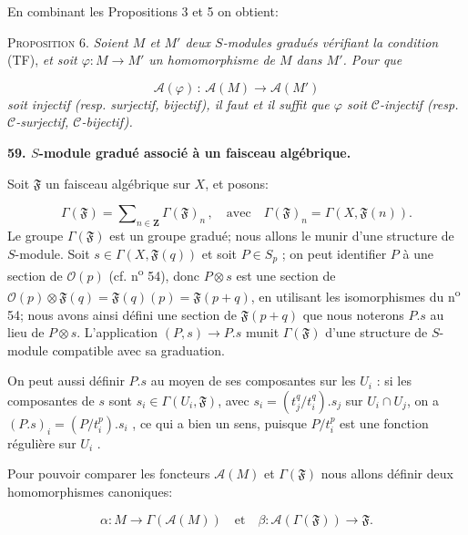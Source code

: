 En combinant les Propositions 3 et 5 on obtient:

\textsc{Proposition} 6. \textit{Soient $M$ et $M'$ deux $S$-modules gradués vérifiant la condition} (TF), \textit{et soit $\varphi : M \to M'$ un homomorphisme de $M$ dans $M'$. Pour que}

\begin{equation*}
\mathcal{A}(\varphi) \, : \, \mathcal{A}(M) \to \mathcal{A}(M')
\end{equation*}
\textit{soit injectif (resp. surjectif, bijectif), il faut et il suffit que $\varphi$ soit $\mathcal{C}$-injectif (resp. $\mathcal{C}$-surjectif, $\mathcal{C}$-bijectif).}


\textbf{59. $S$-module gradué associé à un faisceau algébrique.}

Soit $\mathfrak{F}$ un faisceau algébrique sur $X$, et posons:

\begin{equation*}
\Gamma(\mathfrak{F}) = \sum\nolimits_{n \in \mathbf{Z}} \Gamma(\mathfrak{F})_{n} \, , \quad \mathrm{avec} \quad \Gamma(\mathfrak{F})_{n} = \Gamma(X, \mathfrak{F}(n)).
\end{equation*}
Le groupe $\Gamma(\mathfrak{F})$ est un groupe gradué; nous allons le munir d'une structure de $S$-module. Soit $s \in \Gamma(X, \mathfrak{F}(q))$ et soit $P \in S_{p}$ ; on peut identifier $P$ à une section de $\mathcal{O}(p)$ (cf. n\textsuperscript{o} 54), donc $P \otimes s$ est une section de $\mathcal{O}(p) \otimes \mathfrak{F}(q) = \mathfrak{F}(q)(p) = \mathfrak{F}(p + q)$, en utilisant les isomorphismes du n\textsuperscript{o} 54; nous avons ainsi défini une section de $\mathfrak{F}(p + q)$ que nous noterons $P.s$ au lieu de $P \otimes s$. L'application $(P, s) \to P.s$ munit $\Gamma(\mathfrak{F})$ d'une structure de $S$-module compatible avec sa graduation.

On peut aussi définir $P.s$ au moyen de ses composantes sur les $U_{i}$ : si les composantes de $s$ sont $s_{i} \in \Gamma(U_{i} , \mathfrak{F})$, avec $s_{i} = (t_{j}^{q}/t_{i}^{q}).s_{j}$ sur $U_{i} \cap U_{j}$, on a $(P.s)_{i} = (P/t_{i}^{p}).s_{i}$ , ce qui a bien un sens, puisque $P/t_{i}^{p}$ est une fonction régulière sur $U_{i}$ .

Pour pouvoir comparer les foncteurs $\mathcal{A}(M)$ et $\Gamma(\mathfrak{F})$ nous allons définir deux homomorphismes canoniques:

\begin{equation*}
\alpha : M \to \Gamma(\mathcal{A}(M)) \quad \mathrm{et} \quad \beta : \mathcal{A}(\Gamma(\mathfrak{F})) \to \mathfrak{F}.
\end{equation*}

